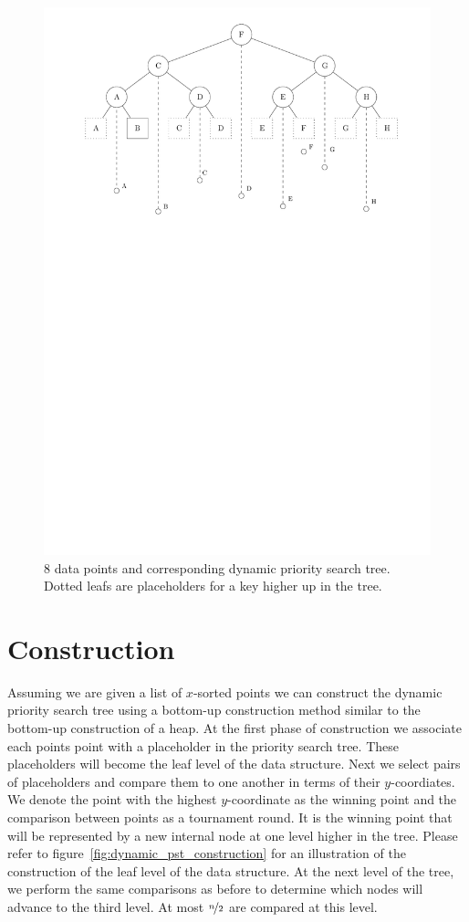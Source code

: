 \documentclass[twoside,11pt,openright]{report}
\begin{document}
\begin{figure}[h]
	\centering
	\includegraphics[scale=0.68]{../figures/internal_pst_dynamic}
	\caption{8 data points and corresponding dynamic priority search tree. Dotted leafs are placeholders for a key higher up in the tree.}
	\label{fig:dynamic_pst}
\end{figure}

\section{Construction}
Assuming we are given a list of $x$-sorted points we can construct the dynamic priority search tree using a bottom-up construction method similar to the bottom-up construction of a heap. At the first phase of construction we associate each points point with a placeholder in the priority search tree. These placeholders will become the leaf level of the data structure. Next we select pairs of placeholders and compare them to one another in terms of their $y$-coordiates. We denote the point with the highest $y$-coordinate as the winning point and the comparison between points as a tournament round. It is the winning point that will be represented by a new internal node at one level higher in the tree. Please refer to figure~\ref{fig:dynamic_pst_construction} for an illustration of the construction of the leaf level of the data structure.
At the next level of the tree, we perform the same comparisons as before to determine which nodes will advance to the third level. At most $\nicefrac{n}{2}$ are compared at this level.
\end{document}
